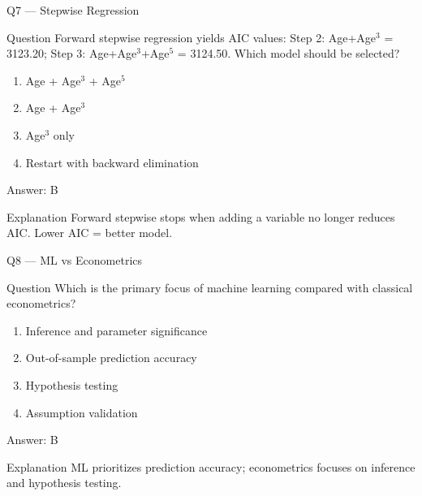 \documentclass[aspectratio=169,8pt]{beamer}
\begin{document}
	\begin{frame}{Q7 --- Stepwise Regression}
		\begin{block}{Question}
			Forward stepwise regression yields AIC values: Step 2: Age+Age$^3$ = 3123.20; Step 3: Age+Age$^3$+Age$^5$ = 3124.50. Which model should be selected?
		\end{block}
		\begin{enumerate}
			\item Age + Age$^3$ + Age$^5$
			\item Age + Age$^3$
			\item Age$^3$ only
			\item Restart with backward elimination
		\end{enumerate}
		\begin{exampleblock}{Answer: B}\end{exampleblock}
		\begin{block}{Explanation}
			Forward stepwise stops when adding a variable no longer reduces AIC. Lower AIC = better model.
		\end{block}
	\end{frame}
	
	\begin{frame}{Q8 --- ML vs Econometrics}
		\begin{block}{Question}
			Which is the primary focus of machine learning compared with classical econometrics?
		\end{block}
		\begin{enumerate}
			\item Inference and parameter significance
			\item Out-of-sample prediction accuracy
			\item Hypothesis testing
			\item Assumption validation
		\end{enumerate}
		\begin{exampleblock}{Answer: B}\end{exampleblock}
		\begin{block}{Explanation}
			ML prioritizes prediction accuracy; econometrics focuses on inference and hypothesis testing.
		\end{block}
	\end{frame}
	
\end{document}
